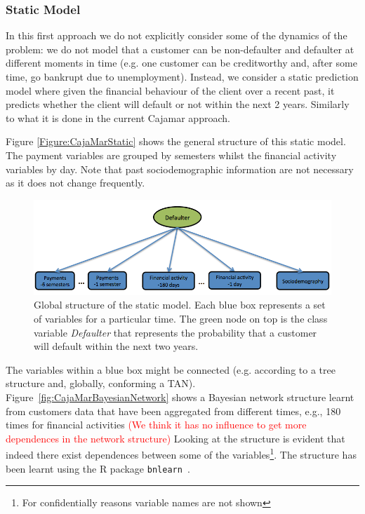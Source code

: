\subsubsection*{Static Model} 

In this first approach we do not explicitly consider some of the dynamics of the problem: we do not model that a customer can be non-defaulter and defaulter at different moments in time (e.g. one customer can be creditworthy and, after some time, go bankrupt due to unemployment). Instead, we consider a static prediction model where given the financial behaviour of the client over a recent past, it predicts whether the client will default or not within the next 2 years. Similarly to what it is done in the current Cajamar approach. 

Figure \ref{Figure:CajaMarStatic} shows the general structure of this static model. The payment variables are grouped by semesters whilst the financial activity variables by day. Note that past sociodemographic information are not necessary as it does not change frequently.

\begin{figure}[htbp]
  \centering
\includegraphics[scale=0.5]{./figures/CajaMarModel0}
\caption{\label{Figure:CajaMarStatic}Global structure of the static model. Each blue box represents a set of variables for a particular time. The green node on top is the class variable \emph{Defaulter} that represents the probability that a customer will default within the next two years. } 
\label{fig:static}
\end{figure}

The variables within a blue box might be connected (e.g. according to a tree structure and, globally, conforming a TAN). Figure~\ref{fig:CajaMarBayesianNetwork} shows a Bayesian network structure learnt from customers data that have been aggregated from different times, e.g., 180 times for financial activities \textcolor{red}{(We think it has no influence to get more dependences in the network structure) }
Looking at the structure is evident that indeed there exist dependences between some of the variables\footnote{For confidentially reasons variable names are not shown}. The structure has been learnt using the R package \texttt{bnlearn}~\cite{Scu10, Nag13}.

